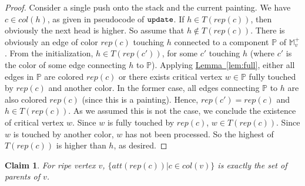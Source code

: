 \documentclass[11pt]{article}
\newcommand{\ignore}[1]{}
\newtheorem{claim}[theorem]{Claim}
\theoremstyle{definition}
\newcommand{\MM}{\mathbb{M}}
\newcommand{\PP}{\mathbb{P}}
\newcommand{\eps}{\varepsilon}
\newcommand{\Lem}[1]{\hyperref[lem:#1]{Lemma~\ref*{lem:#1}}} %
\newcommand{\col}{col}
\newcommand{\fcol}{full}
\newcommand{\h}{att}
\newcommand{\rep}{rep}
\newcommand{\update}{{\tt update}}
\begin{document}
\begin{proof} Consider a single push onto the stack and the current painting. We have $c \in \col(h)$, as given in pseudocode of $\update$.
If $h \in T(\rep(c))$, then obviously the next head is higher. So assume that $h \notin T(\rep(c))$.
There is obviously an edge of color $\rep(c)$ touching $h$ connected to a component $\PP$ of $\MM^+_v$. 
From the initialization, $h \in T(\rep(c'))$, for some $c'$ touching $h$ (where $c'$ is the color
of some edge connecting $h$ to $\PP$).
Applying \Lem{full},  either all edges in $\PP$ are colored $\rep(c)$ or 
there exists critical vertex $w \in \PP$ fully touched by $\rep(c)$ and another color.
In the former case, all edges connecting $\PP$ to $h$ are also colored $\rep(c)$
(since this is a painting). Hence, $\rep(c') = \rep(c)$ and $h \in T(\rep(c))$.
As we assumed this is not the case, we conclude the existence of critical vertex $w$.
Since $w$ is fully touched by $\rep(c)$, $w \in T(\rep(c))$. Since $w$
is touched by another color, $w$ has not been processed. So the highest of $T(\rep(c))$
is higher than $h$, as desired.
\ignore{
If all edges touching $h$ that connect to this component are also colored $\rep(c)$, then
In Case (i), the increase in height is obvious.
Consider Case (ii). There is a vertex $v$ touched by color $c \notin \fcol(v)$. Consider the highest
vertex $w$ that is touched by $c$ and some other color. Clearly such a vertex exists, since the condition
is also satisfied by $v$. Take the $(f(w)+\delta)$-contour $\phi$ that intersects $B_\eps(v)$
and intersect some $c$-colored edge incident to $w$. Note that $\phi$ is also colored $c$,
since $w$ is the highest vertex to be touched by $c$ and some other color. (Take the path of $c$-colored
edges from the maximum to $w$. For any point on this path, the contour passing through this point must
be colored $c$.) Hence, $c \in \fcol(w)$ and $w \neq v$. Furthermore, $w$ is a critical point,
since $w$ is touched by another color. The corresponding edge cannot intersect $\phi$, so $w$
must have up-degree $2$.
All in all, when a new vertex is pushed onto the stack, it is always higher than the previous head.
}
\end{proof}


\begin{claim} \label{clm:ripe} For ripe vertex $v$, $\{\h(\rep(c)) | c \in \col(v)\}$ is exactly
the set of parents of $v$.
\end{claim}
\end{document}
